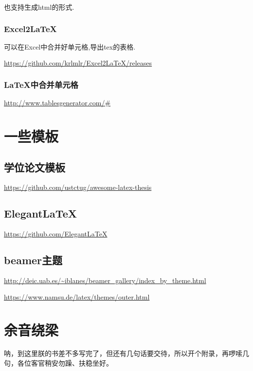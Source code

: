 \documentclass[]{ctexbook}
\begin{document}
也支持生成html的形式.

\hypertarget{excel2latex}{%
\subsection{Excel2LaTeX}\label{excel2latex}}

可以在Excel中合并好单元格,导出tex的表格.

\url{https://github.com/krlmlr/Excel2LaTeX/releases}

\hypertarget{latex}{%
\subsection{LaTeX中合并单元格}\label{latex}}

\url{http://www.tablesgenerator.com/\#}

\hypertarget{section-20}{%
\chapter{一些模板}\label{section-20}}

\hypertarget{section-21}{%
\section{学位论文模板}\label{section-21}}

\url{https://github.com/ustctug/awesome-latex-thesis}

\hypertarget{elegantlatex}{%
\section{ElegantLaTeX}\label{elegantlatex}}

\url{https://github.com/ElegantLaTeX}

\hypertarget{beamer}{%
\section{beamer主题}\label{beamer}}

\url{http://deic.uab.es/~iblanes/beamer_gallery/index_by_theme.html}

\url{https://www.namsu.de/latex/themes/outer.html}

\cleardoublepage

\hypertarget{appendix-}{%
\appendix {}}


\hypertarget{sound}{%
\chapter{余音绕梁}\label{sound}}

呐，到这里朕的书差不多写完了，但还有几句话要交待，所以开个附录，再啰嗦几句，各位客官稍安勿躁、扶稳坐好。



\backmatter
\printindex
\end{document}
